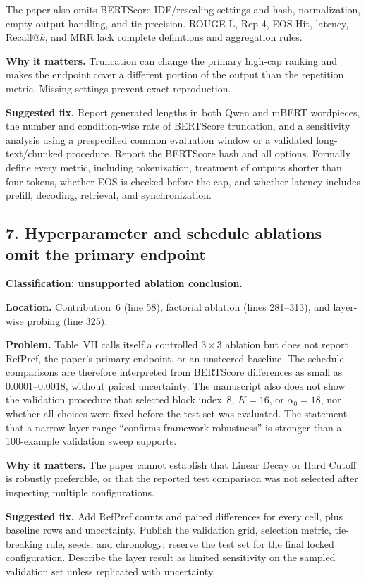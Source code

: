 \documentclass[11pt]{article}
\newcommand{\status}[1]{\textbf{#1}}
\begin{document}
The paper also omits BERTScore IDF/rescaling settings and hash, normalization, empty-output handling, and tie precision.  ROUGE-L, Rep-4, EOS Hit, latency, Recall@$k$, and MRR lack complete definitions and aggregation rules.

\status{Why it matters.} Truncation can change the primary high-cap ranking and makes the endpoint cover a different portion of the output than the repetition metric.  Missing settings prevent exact reproduction.

\status{Suggested fix.} Report generated lengths in both Qwen and mBERT wordpieces, the number and condition-wise rate of BERTScore truncation, and a sensitivity analysis using a prespecified common evaluation window or a validated long-text/chunked procedure.  Report the BERTScore hash and all options.  Formally define every metric, including tokenization, treatment of outputs shorter than four tokens, whether EOS is checked before the cap, and whether latency includes prefill, decoding, retrieval, and synchronization.

\subsection*{7. Hyperparameter and schedule ablations omit the primary endpoint}

\status{Classification: unsupported ablation conclusion.}

\status{Location.} Contribution~6 (line 58), factorial ablation (lines 281--313), and layer-wise probing (line 325).

\status{Problem.} Table~VII calls itself a controlled $3\times3$ ablation but does not report RefPref, the paper's primary endpoint, or an unsteered baseline.  The schedule comparisons are therefore interpreted from BERTScore differences as small as 0.0001--0.0018, without paired uncertainty.  The manuscript also does not show the validation procedure that selected block index~8, $K=16$, or $\alpha_0=18$, nor whether all choices were fixed before the test set was evaluated.  The statement that a narrow layer range ``confirms framework robustness'' is stronger than a 100-example validation sweep supports.

\status{Why it matters.} The paper cannot establish that Linear Decay or Hard Cutoff is robustly preferable, or that the reported test comparison was not selected after inspecting multiple configurations.

\status{Suggested fix.} Add RefPref counts and paired differences for every cell, plus baseline rows and uncertainty.  Publish the validation grid, selection metric, tie-breaking rule, seeds, and chronology; reserve the test set for the final locked configuration.  Describe the layer result as limited sensitivity on the sampled validation set unless replicated with uncertainty.
\end{document}
